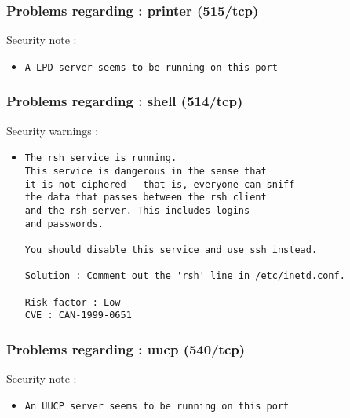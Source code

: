 \documentclass{article}
\begin{document}
\subsubsection{Problems regarding : printer (515/tcp)}
Security note :\\
\begin{itemize}
\item \begin{verbatim}
A LPD server seems to be running on this port
\end{verbatim}\end{itemize}
\subsubsection{Problems regarding : shell (514/tcp)}
Security warnings :\\
\begin{itemize}
\item \begin{verbatim}
The rsh service is running.
This service is dangerous in the sense that
it is not ciphered - that is, everyone can sniff
the data that passes between the rsh client
and the rsh server. This includes logins
and passwords.

You should disable this service and use ssh instead.

Solution : Comment out the 'rsh' line in /etc/inetd.conf.

Risk factor : Low
CVE : CAN-1999-0651
\end{verbatim}\end{itemize}
\subsubsection{Problems regarding : uucp (540/tcp)}
Security note :\\
\begin{itemize}
\item \begin{verbatim}
An UUCP server seems to be running on this port
\end{verbatim}\end{itemize}
\end{document}
